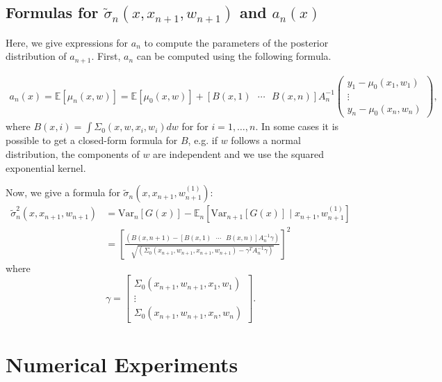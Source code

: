 \documentclass{article} %
\newcommand{\w}{w}
\newcommand{\sigmatilde}{\tilde{\sigma}}
\begin{document}
\subsection{Formulas for $\sigmatilde_{n}\left(x,x_{n+1},\w_{n+1}\right)$
and $a_{n}\left(x\right)$ }

Here, we give expressions for $a_n$  to compute the parameters of the posterior distribution of $a_{n+1}$. First,
$a_{n}$ can be computed using the following formula.

\begin{align*}
a_{n}\left(x\right) = \mathbb{E}\left[\mu_{n}\left(x,\w\right)\right]
 = \mathbb{E}\left[\mu_{0}\left(x,\w\right)\right]
 +\left[B\left(x,1\right)\mbox{ }\cdots\mbox{ }B\left(x,n\right)\right]A_{n}^{-1}\left(\begin{array}{c}
y_{1}-\mu_{0}\left(x_{1},\w_{1}\right)\\
\vdots\\
y_{n}-\mu_{0}\left(x_{n},\w_{n}\right)
\end{array}\right),
\end{align*}
where $B\left(x,i\right) =  \int\Sigma_{0}\left(x,\w,x_{i},\w_{i}\right)d\w$ for for $i=1,\ldots,n$.  In some cases it is possible to get a closed-form formula for $B$, e.g. if $\w$ follows a normal distribution, the components of $\w$ are independent and we use the squared exponential kernel.

Now, we give a formula for $\sigmatilde_{n}\left(x,x_{n+1},\w_{n+1}^{\left(1\right)}\right)$:
\begin{align*}
\sigmatilde^2_{n}\left(x,x_{n+1},\w_{n+1}\right)
 & = \mbox{Var}_{n}\left[G\left(x\right)\right]-\mathbb{E}_{n}\left[\mbox{Var}_{n+1}\left[G\left(x\right)\right]\mid x_{n+1},\w_{n+1}^{\left(1\right)}\right]\\
 & = \left[\frac{\left(B\left(x,n+1\right)-\left[B\left(x,1\right)\mbox{ }\cdots\mbox{ }B\left(x,n\right)\right]A_{n}^{-1}\gamma\right)}{\sqrt{\left(\Sigma_{0}\left(x_{n+1},\w_{n+1},x_{n+1},\w_{n+1}\right)-\gamma^{T}A_{n}^{-1}\gamma\right)}}\right]^{2}
\end{align*}
where 
\[
\gamma=\left[\begin{array}{c}
\Sigma_{0}\left(x_{n+1},\w_{n+1},x_{1},\w_{1}\right)\\
\vdots\\
\Sigma_{0}\left(x_{n+1},\w_{n+1},x_{n},\w_{n}\right)
\end{array}\right].
\]



\section{Numerical Experiments}
\label{experiments}
\end{document}
